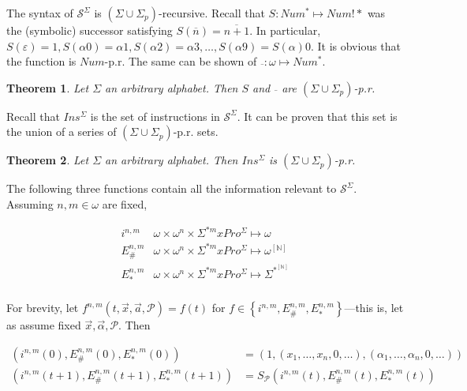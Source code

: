 \documentclass[a4paper, 12pt]{article}
\newtheorem{theorem}{Theorem}
\newtheorem{theorem}{Theorem}
\begin{document}
The syntax of $\mathcal{S}^{\Sigma}$ is $(\Sigma \cup \Sigma_p)$-recursive.
Recall that $S : Num^* \mapsto Num!*$ was the (symbolic) successor satisfying
$S(\overline{n}) = \overline{n+1}$. In particular, $S(\varepsilon) = 1,
S(\alpha 0) = \alpha1, S(\alpha 2) = \alpha 3, \ldots, S(\alpha 9) =
S(\alpha)0$. It is obvious that the function is $Num$-p.r. The same can be shown
of $\overline{ ~  } : \omega \mapsto Num^*$.

\begin{theorem}
    Let $\Sigma$ an arbitrary alphabet. Then $S$ and $\overline{~}$ are $(\Sigma
    \cup \Sigma_p)$-p.r.
\end{theorem}

Recall that $Ins^{\Sigma}$ is the set of instructions in $\mathcal{S}^\Sigma$.
It can be proven that this set is the union of a series of $(\Sigma \cup
\Sigma_p)$-p.r. sets. 

\begin{theorem}
    Let $\Sigma$ an arbitrary alphabet. Then $Ins^{\Sigma}$ is $(\Sigma \cup
    \Sigma_p)$-p.r.
\end{theorem}



The following three functions contain all the information relevant to
$\mathcal{S}^{\Sigma}$. Assuming $n, m \in \omega$ are fixed, 

\begin{align*}
    i^{n, m} & \omega \times \omega^n \times \Sigma^{*m} x Pro^{\Sigma} \mapsto
    \omega \\
    E_{\#}^{n, m} & \omega \times \omega^n \times \Sigma^{*m} x Pro^{\Sigma} \mapsto
    \omega^{[\mathbb{N}]} \\
    E_{*}^{n, m} & \omega \times \omega^n \times \Sigma^{*m} x Pro^{\Sigma} \mapsto
    \Sigma^{*}^{[ \mathbb{N} ]} \\
\end{align*}

For brevity, let $f^{n, m}(t, \vec{x}, \vec{a}, \mathcal{P}) = f(t)$ for $f \in \left\{
i^{n, m}, E_\#^{n, m}, E_*^{n, m}\right\} $---this is, let as assume fixed
$\vec{x}, \vec{\alpha}, \mathcal{P}$. Then

\begin{align*}
    \left( i^{n, m}(0), E_{\#}^{n, m}(0), E_{*}^{n, m}(0) \right) &= \left( 1,
    \left( x_1, \ldots, x_n, 0, \ldots \right), \left( \alpha_1, \ldots,
\alpha_n, 0, \ldots \right)   \right)  \\ 
        \left( i^{n, m}(t+1), E_{\#}^{n, m}(t+1), E_{*}^{n, m}(t+1) \right) &=
        S_{\mathcal{P}}\left( i^{n, m}(t), E_{\#}^{n, m}(t), E_{*}^{n, m}(t)
   \right)  \\ 
\end{align*}
\end{document}
